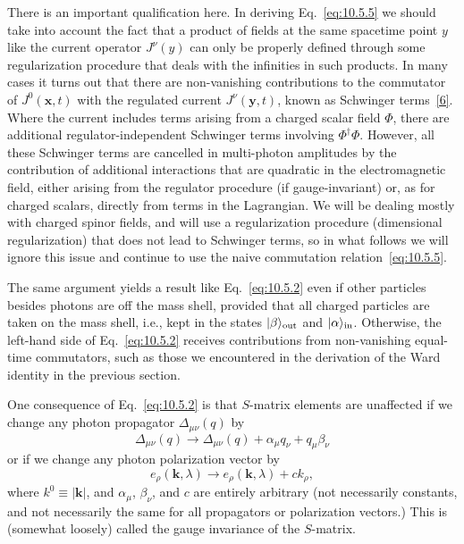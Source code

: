 There is an important qualification here. In deriving Eq.~\eqref{eq:10.5.5}
we should take into account the fact that a product of fields at the same
spacetime point $y$ like the current operator $J^\nu(y)$ can only be properly
defined through some regularization procedure that deals with the infinities
in such products. In many cases it turns out that there are non-vanishing
contributions to the commutator of $J^0(\mathbf{x},t)$ with the regulated
current $J^\nu(\mathbf{y},t)$, known as Schwinger terms~\hyperref[ref:10.6]{[6]}.
Where the current includes terms arising from a charged scalar field $\Phi$,
there are additional regulator-independent Schwinger terms involving
$\Phi^\dagger\Phi$. However, all these Schwinger terms are cancelled in
multi-photon amplitudes by the contribution of additional interactions that
are quadratic in the electromagnetic field, either arising from the regulator
procedure (if gauge-invariant) or, as for charged scalars, directly from terms
in the Lagrangian. We will be dealing mostly with charged spinor fields, and
will use a regularization procedure (dimensional regularization) that does not
lead to Schwinger terms, so in what follows we will ignore this issue and
continue to use the naive commutation relation~\eqref{eq:10.5.5}.

The same argument yields a result like Eq.~\eqref{eq:10.5.2} even if other
particles besides photons are off the mass shell, provided that all charged
particles are taken on the mass shell, i.e., kept in the states
$\lvert \beta\rangle_{\mathrm{out}}$ and $\lvert \alpha\rangle_{\mathrm{in}}$. Otherwise, the
left-hand side of Eq.~\eqref{eq:10.5.2} receives contributions from
non-vanishing equal-time commutators, such as those we encountered in the
derivation of the Ward identity in the previous section.

One consequence of Eq.~\eqref{eq:10.5.2} is that $S$-matrix elements are
unaffected if we change any photon propagator $\Delta_{\mu\nu}(q)$ by
\begin{equation}
  \Delta_{\mu\nu}(q)\longrightarrow
  \Delta_{\mu\nu}(q)+\alpha_\mu q_\nu+q_\mu\beta_\nu
  \tag{10.5.7}\label{eq:10.5.7}
\end{equation}
or if we change any photon polarization vector by
\begin{equation}
  e_\rho(\mathbf{k},\lambda)\longrightarrow
  e_\rho(\mathbf{k},\lambda)+ck_\rho,
  \tag{10.5.8}\label{eq:10.5.8}
\end{equation}
where $k^0\equiv|\mathbf{k}|$, and $\alpha_\mu$, $\beta_\nu$, and $c$ are
entirely arbitrary (not necessarily constants, and not necessarily the same
for all propagators or polarization vectors.) This is (somewhat loosely)
called the gauge invariance of the $S$-matrix.

